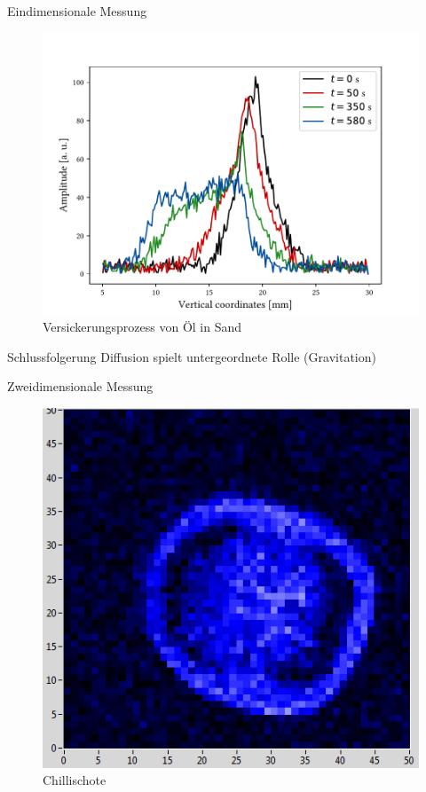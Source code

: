 \begin{frame}{Eindimensionale Messung}
	\begin{figure}
	\centering
	\includegraphics[scale=.35]{..//figures//f61_abb_9.pdf}
	\caption{Versickerungsprozess von Öl in Sand}
	\end{figure}
	\begin{block}{Schlussfolgerung}
	Diffusion spielt untergeordnete Rolle (Gravitation)
	\end{block}
\end{frame}

\begin{frame}{Zweidimensionale Messung}
	\begin{figure}
	\centering
	\includegraphics[scale=.5]{..//figures//chilipepper.png}
	\caption{Chillischote}
	\end{figure}
\end{frame}

